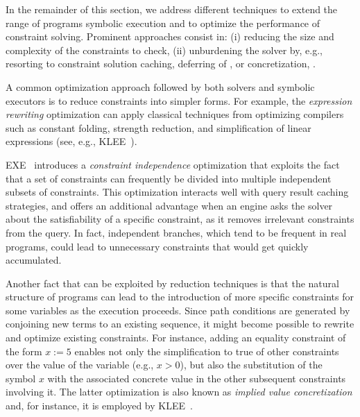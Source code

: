 In the remainder of this section, we address different techniques to extend the range of programs  symbolic execution and to optimize the performance of constraint solving. Prominent approaches consist in: (i) reducing the size and complexity of the constraints to check, (ii) unburdening the solver by, e.g., resorting to constraint solution caching, deferring of , or concretization, .


A common optimization approach followed by both solvers and symbolic executors is to reduce constraints into simpler forms. For example, the {\em expression rewriting} optimization can apply classical techniques from optimizing compilers such as constant folding, strength reduction, and simplification of linear expressions (see, e.g., {\sc KLEE}~\cite{KLEE-OSDI08}).

{\sc EXE}~\cite{EXE-CCS06} introduces a {\em constraint independence} optimization that exploits the fact that a set of constraints can frequently be divided into multiple independent subsets of constraints. This optimization interacts well with query result caching strategies, and offers an additional advantage when an engine asks the solver about the satisfiability of a specific constraint, as it removes irrelevant constraints from the query. In fact, independent branches, which tend to be frequent in real programs, could lead to unnecessary constraints that would get quickly accumulated.

Another fact that can be exploited by reduction techniques is that the natural structure of programs can lead to the introduction of more specific constraints for some variables as the execution proceeds. Since path conditions are generated by conjoining new terms to an existing sequence, it might become possible to rewrite and optimize existing constraints. For instance, adding an equality constraint of the form $x:=5$ enables not only the simplification to true of other constraints over the value of the variable (e.g., $x>0$), but also the substitution of the symbol $x$ with the associated concrete value in the other subsequent constraints involving it. The latter optimization is also known as {\em implied value concretization} and, for instance, it is employed by {\sc KLEE}~\cite{KLEE-OSDI08}.


